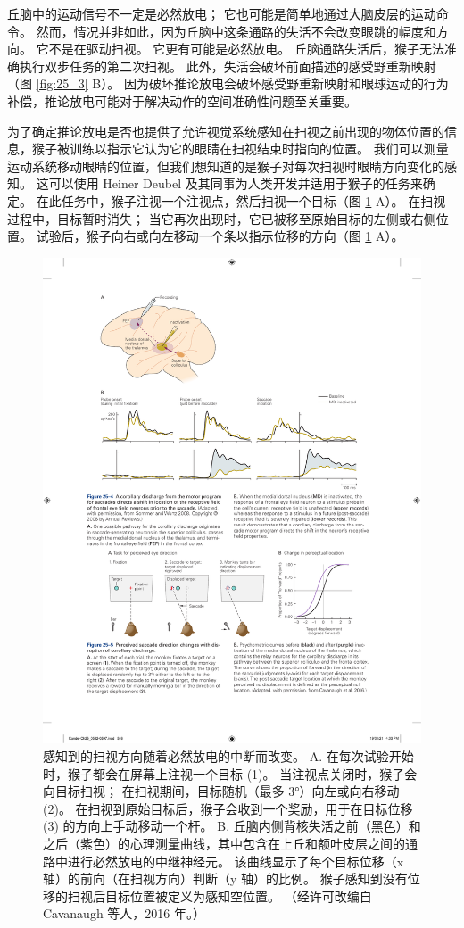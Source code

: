 丘脑中的运动信号不一定是必然放电； 它也可能是简单地通过大脑皮层的运动命令。 然而，情况并非如此，因为丘脑中这条通路的失活不会改变眼跳的幅度和方向。 它不是在驱动扫视。 它更有可能是必然放电。 丘脑通路失活后，猴子无法准确执行双步任务的第二次扫视。 此外，失活会破坏前面描述的感受野重新映射（图 \ref{fig:25_3} B）。 
因为破坏推论放电会破坏感受野重新映射和眼球运动的行为补偿，推论放电可能对于解决动作的空间准确性问题至关重要。

为了确定推论放电是否也提供了允许视觉系统感知在扫视之前出现的物体位置的信息，猴子被训练以指示它认为它的眼睛在扫视结束时指向的位置。 我们可以测量运动系统移动眼睛的位置，但我们想知道的是猴子对每次扫视时眼睛方向变化的感知。 这可以使用 Heiner Deubel 及其同事为人类开发并适用于猴子的任务来确定。 在此任务中，猴子注视一个注视点，然后扫视一个目标（图 \ref{fig:25_5} A）。 
在扫视过程中，目标暂时消失； 当它再次出现时，它已被移至原始目标的左侧或右侧位置。 试验后，猴子向右或向左移动一个条以指示位移的方向（图 \ref{fig:25_5} A）。

\begin{figure}[htbp]
	\centering
	\includegraphics[width=0.8\linewidth]{chap25/fig_25_5}
	\caption{感知到的扫视方向随着必然放电的中断而改变。 A. 在每次试验开始时，猴子都会在屏幕上注视一个目标 (1)。 当注视点关闭时，猴子会向目标扫视； 在扫视期间，目标随机（最多 3°）向左或向右移动 (2)。 在扫视到原始目标后，猴子会收到一个奖励，用于在目标位移 (3) 的方向上手动移动一个杆。 B. 丘脑内侧背核失活之前（黑色）和之后（紫色）的心理测量曲线，其中包含在上丘和额叶皮层之间的通路中进行必然放电的中继神经元。 该曲线显示了每个目标位移（x 轴）的前向（在扫视方向）判断（y 轴）的比例。 猴子感知到没有位移的扫视后目标位置被定义为感知空位置。 （经许可改编自 Cavanaugh 等人，2016 年。）}
	\label{fig:25_5}
\end{figure}


